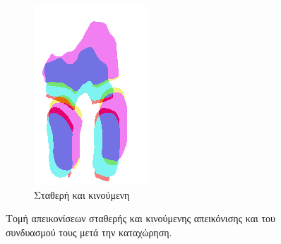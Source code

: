 \documentclass[a4paper,12pt]{article}
\begin{document}
\begin{figure}[H]
    \begin{subfigure}[t]{0.4\linewidth}
    \includegraphics[width=\linewidth]{combination_label_before_registration_2.png}
    \caption{Σταθερή και κινούμενη}
    \end{subfigure}

    \caption{Τομή απεικονίσεων σταθερής και κινούμενης απεικόνισης και του
             συνδυασμού τους μετά την καταχώρηση.}
    \label{fig:registration_before:2}
\end{figure}
\end{document}
